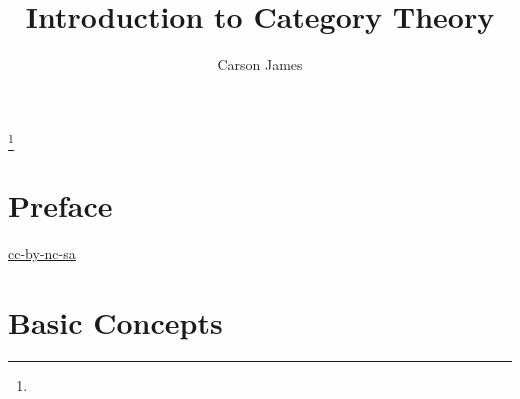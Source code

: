 \documentclass{book}
\theoremstyle{definition}
\DeclareMathOperator*{\0}{\mbf{0}}
\DeclareMathOperator*{\1}{\mbf{1}}
\begin{document}
	
	\frontmatter
	
	\title{Introduction to Category Theory}
	
	
	\author{Carson James}
	\thanks{}
	
	\date{}
	
	\maketitle
	
	
	\setcounter{page}{4}
	
	\tableofcontents
	\printunsrtglossary[type=symbols,style=long,title={Notation}]
	
	
	\mainmatter
	
	\chapter*{Preface}
	
	\begin{flushleft}
		\href{https://creativecommons.org/licenses/by-nc-sa/4.0/legalcode.txt}{cc-by-nc-sa}
	\end{flushleft}

	\newpage
	
	
	
	
	
	
	
	
	
	
	
	
	
	
	
	
	\chapter{Basic Concepts}
	
\end{document}
